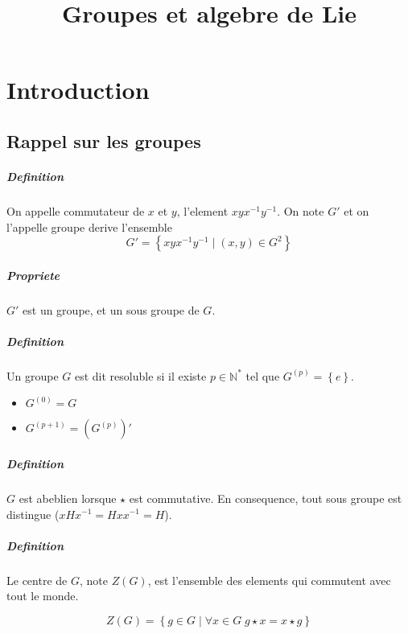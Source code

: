 \documentclass[a4paper, 12pt, leqno]{report}
\title{\huge{Groupes et algebre de Lie}}
\newcommand{\N}{\ensuremath{\mathbb{N}}}
\begin{document}
\maketitle
\newpage
\tableofcontents
\newpage

\chapter{Introduction}

\section{Rappel sur les groupes}

\paragraph{Definition}

On appelle commutateur de $x$ et $y$, l'element $xyx^{-1}y^{-1}$. On
note $G'$ et on l'appelle groupe derive l'ensemble
$$G' = \left \{ xyx^{-1}y^{-1} \; | \; (x,y) \in G^2 \right \}$$

\paragraph{Propriete}

$G'$ est un groupe, et un sous groupe de $G$.

\paragraph{Definition}

Un groupe $G$ est dit resoluble si il existe $p \in \N^*$ tel que
$G^{(p)} = \left \{ e \right \}$.
\begin{itemize}
\item $G^{(0)} = G$
\item $G^{(p+1)} = \left( G^{(p)} \right)'$
\end{itemize}

\paragraph{Definition}

$G$ est abeblien lorsque $\star$ est commutative. En consequence, tout
sous groupe est distingue ($xHx^{-1} = Hxx^{-1} = H$).

\paragraph{Definition}

Le centre de $G$, note $Z(G)$, est l'ensemble des elements qui
commutent avec tout le monde.

$$Z(G) = \left \{ g \in G \; | \; \forall x \in G \; g \star x = x \star
  g \right \}$$
\end{document}
